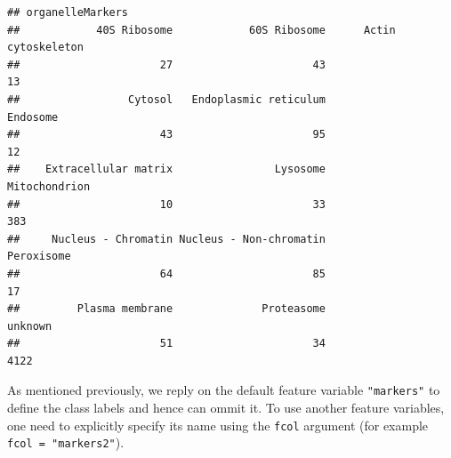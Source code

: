 \begin{knitrout}
\color{fgcolor}\begin{kframe}
\begin{alltt}
 \hlkwb{<-} \hlstd{(}  \hlstd{=} \hlstd{))}
\end{alltt}
\begin{verbatim}
## organelleMarkers
##            40S Ribosome            60S Ribosome      Actin cytoskeleton 
##                      27                      43                      13 
##                 Cytosol   Endoplasmic reticulum                Endosome 
##                      43                      95                      12 
##    Extracellular matrix                Lysosome           Mitochondrion 
##                      10                      33                     383 
##     Nucleus - Chromatin Nucleus - Non-chromatin              Peroxisome 
##                      64                      85                      17 
##         Plasma membrane              Proteasome                 unknown 
##                      51                      34                    4122
\end{verbatim}
\begin{alltt}
 \hlkwb{<-} \hlopt{/}\hlstd{w[} \hlopt{!=} \hlstd{]}
\end{alltt}
\end{kframe}
\end{knitrout}

\begin{knitrout}
\color{fgcolor}\begin{kframe}
\begin{alltt}
 \hlkwb{<-}   \hlstd{=} \hlstd{,}
                           \hlstd{=} \hlstd{,}  \hlstd{=} \hlstd{,}
                           
\end{alltt}
\end{kframe}
\end{knitrout}

As mentioned previously, we reply on the default feature variable
\texttt{"markers"} to define the class labels and hence can ommit
it. To use another feature variables, one need to explicitly specify
its name using the \texttt{fcol} argument (for example \texttt{fcol =
  "markers2"}).

